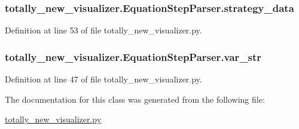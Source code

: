 \subsubsection[{strategy\+\_\+data}]{\setlength{\rightskip}{0pt plus 5cm}totally\+\_\+new\+\_\+visualizer.\+Equation\+Step\+Parser.\+strategy\+\_\+data}\label{classtotally__new__visualizer_1_1_equation_step_parser_ac5cad9ea5ae6ed0d1c86a506b0a0e76e}


Definition at line 53 of file totally\+\_\+new\+\_\+visualizer.\+py.

\hypertarget{classtotally__new__visualizer_1_1_equation_step_parser_a021358bd55a4cea135012d4a83138711}{}
\subsubsection[{var\+\_\+str}]{\setlength{\rightskip}{0pt plus 5cm}totally\+\_\+new\+\_\+visualizer.\+Equation\+Step\+Parser.\+var\+\_\+str}\label{classtotally__new__visualizer_1_1_equation_step_parser_a021358bd55a4cea135012d4a83138711}


Definition at line 47 of file totally\+\_\+new\+\_\+visualizer.\+py.



The documentation for this class was generated from the following file\+:\begin{DoxyCompactItemize}
\item 
\hyperlink{totally__new__visualizer_8py}{totally\+\_\+new\+\_\+visualizer.\+py}\end{DoxyCompactItemize}
